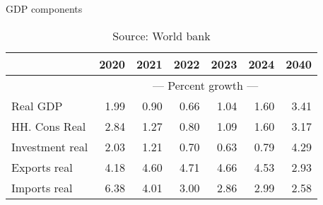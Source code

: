 \documentclass{article}
\begin{document}
\begin{table}[ht]
\caption{GDP components}
\begin{tabular}{lrrrrr|r}
\toprule
 & 2020 & 2021 & 2022 & 2023 & 2024 & 2040 \\
\midrule
&\multicolumn{6}{c}{{---  Percent growth ---}}                               \\
Real GDP & 1.99 & 0.90 & 0.66 & 1.04 & 1.60 & 3.41 \\
HH. Cons Real & 2.84 & 1.27 & 0.80 & 1.09 & 1.60 & 3.17 \\
Investment real & 2.03 & 1.21 & 0.70 & 0.63 & 0.79 & 4.29 \\
Exports real & 4.18 & 4.60 & 4.71 & 4.66 & 4.53 & 2.93 \\
Imports real & 6.38 & 4.01 & 3.00 & 2.86 & 2.99 & 2.58 \\
\bottomrule
\end{tabular}
\caption*{Source: World bank }
\end{table}
\end{document}
